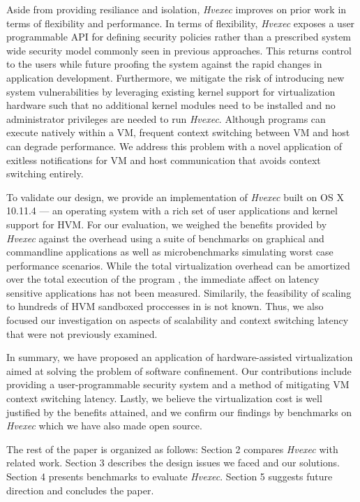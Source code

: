 \documentclass{article}
\newcommand{\PROJNAME}{\textit{Hvexec}}
\begin{document}
Aside from providing resiliance and isolation, \PROJNAME{} improves on prior work in terms of flexibility and performance.
In terms of flexibility, \PROJNAME{} exposes a user programmable API for defining security policies rather than a prescribed system wide security model commonly seen in previous approaches.
This returns control to the users while future proofing the system against the rapid changes in application development.
Furthermore, we mitigate the risk of introducing new system vulnerabilities by leveraging existing kernel support for virtualization hardware
such that no additional kernel modules need to be installed and no administrator privileges are needed to run \PROJNAME{}.
Although programs can execute natively within a VM, frequent context switching between VM and host can degrade performance.
We address this problem with a novel application of exitless notifications \cite{ELI2015} for VM and host communication that avoids
context switching entirely.

To validate our design, we provide an implementation of \PROJNAME{} built on OS X 10.11.4 — an operating system with
a rich set of user applications and kernel support for HVM.
For our evaluation, we weighed the benefits provided by \PROJNAME{} against the overhead using a suite of benchmarks on graphical and commandline applications as well as
microbenchmarks simulating worst case performance scenarios.
While the total virtualization overhead can be amortized over the total execution of the program \cite{Ayer2012, VCall2010}, the immediate affect on latency
sensitive applications has not been measured.
Similarily, the feasibility of scaling to hundreds of HVM sandboxed proccesses in is not known.
Thus, we also focused our investigation on aspects of scalability and context switching latency that were not previously examined.

In summary, we have proposed an application of hardware-assisted virtualization aimed at solving the problem of software confinement.
Our contributions include providing a user-programmable security system and a method of mitigating VM context switching latency.
Lastly, we believe the virtualization cost is well justified by the benefits attained, and we confirm our findings by benchmarks on \PROJNAME{} which we have also made open source.

The rest of the paper is organized as follows:
Section 2 compares \PROJNAME{} with related work.
Section 3 describes the design issues we faced and our solutions.
Section 4 presents benchmarks to evaluate \PROJNAME{}.
Section 5 suggests future direction and concludes the paper.
\end{document}
